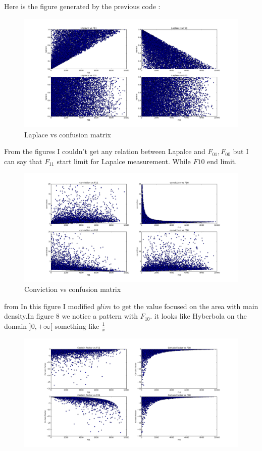 \documentclass{article}
\begin{document}
Here is the figure generated by the previous code : 
\begin{landscape}
\begin{figure}[H]
	\includegraphics[scale=0.5]{laplace.png}
	\caption{Laplace vs confusion matrix}
\end{figure}
From the figures I couldn't get any relation between Lapalce and \(F_{01},F_{00}\) but I can say that \(F_{11}\) start limit for Lapalce measurement. While \(F10\) end limit.
\begin{figure}[H]
	\includegraphics[scale=0.5]{conviction.png}
	\caption{Conviction vs confusion matrix}
\end{figure}from
In this figure I modified \(ylim\) to get the value focused on the area with main density.In figure 8 we notice a pattern with \(F_{10}\). it looks like Hyberbola on the domain \(]0,+ \infty[\) something like \(\frac{1}{x}\)
\begin{figure}[H]
	\includegraphics[scale=0.5]{Certainfactor.png}

\end{figure}
\end{landscape}
\end{document}
